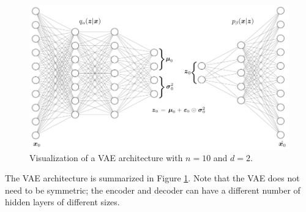 \begin{figure}[h]
  \centering
  \includegraphics[width=.95\textwidth]{img/vae_visual.png}
  \caption{Visualization of a VAE architecture with $n=10$ and $d=2$.}
  \label{fig:vae_visual}
\end{figure}
The VAE architecture is summarized in Figure \ref{fig:vae_visual}. Note that the VAE does not need to be symmetric; the encoder and decoder can have a different number of hidden layers of different sizes.



